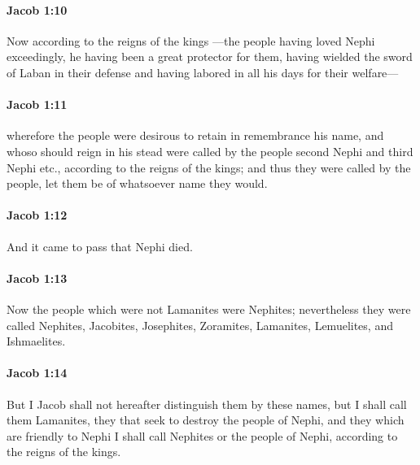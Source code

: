 		\paragraph{Jacob 1:10} %
			\label{JACOB-1-10}

			Now according to the reigns of the kings
			---the people having loved Nephi exceedingly,
			he having been a great protector for them,
			having wielded the sword of Laban in their defense
			and having labored in all his days for their welfare---

		\paragraph{Jacob 1:11} %
			\label{JACOB-1-11}

			wherefore the people were desirous to retain in remembrance his name,
			and whoso should reign in his stead were called by the people
			second Nephi and third Nephi etc.,
			according to the reigns of the kings;
			and thus they were called by the people,
			let them be of whatsoever name they would.

		\paragraph{Jacob 1:12} %
			\label{JACOB-1-12}

			And it came to pass that Nephi died.

		\paragraph{Jacob 1:13} %
			\label{JACOB-1-13}

			Now the people which were not Lamanites were Nephites;
			nevertheless they were called Nephites, Jacobites, Josephites, Zoramites,
			Lamanites, Lemuelites, and Ishmaelites.

		\paragraph{Jacob 1:14} %
			\label{JACOB-1-14}

			But I Jacob shall not hereafter distinguish them by these names,
			but I shall call them Lamanites, they that seek to destroy the people of Nephi,
			and they which are friendly to Nephi I shall call Nephites or the people of Nephi,
			according to the reigns of the kings.

